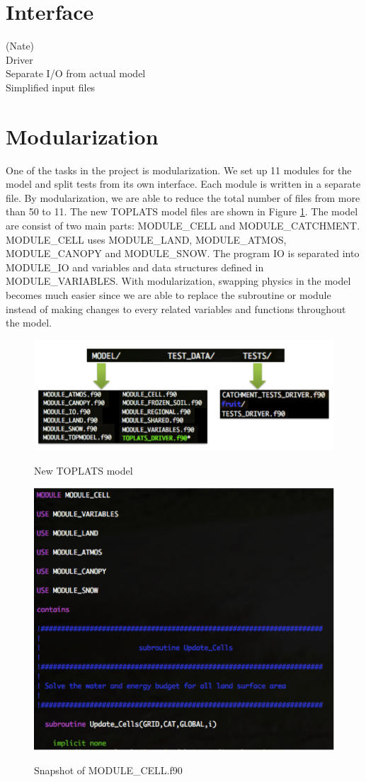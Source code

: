 \documentclass[pdftex,12pt,a4paper]{article}
\begin{document}
\section{Interface}
{(Nate)}
{\\ Driver}
{\\ Separate I/O from actual model}
{\\ Simplified input files}

\section{Modularization}
One of the tasks in the project is modularization. We set up 11 modules for the model and split tests from its own interface. Each module is written in a separate file. By modularization, we are able to reduce the total number of files from more than 50 to 11. The new TOPLATS model files are shown in Figure \ref{Modules1}. The model are consist of two main parts: MODULE\_CELL and MODULE\_CATCHMENT. MODULE\_CELL uses MODULE\_LAND, MODULE\_ATMOS, MODULE\_CANOPY and MODULE\_SNOW. The program IO is separated into MODULE\_IO and variables and data structures defined in MODULE\_VARIABLES. With modularization, swapping physics in the model becomes much easier since we are able to replace the subroutine or module instead of making changes to every related variables and functions throughout the model.

\begin{figure}[h]
	\centering
	\includegraphics[width=4.5in]{Figures/Modules1.png}
	\label{Modules1}
	\caption{New TOPLATS model}
\end{figure}

\begin{figure}[h]
	\centering
	\includegraphics[width=4.5in]{Figures/Modules2.png}
	\label{Modules2}
	\caption{Snapshot of MODULE\_CELL.f90}
\end{figure}
\end{document}
